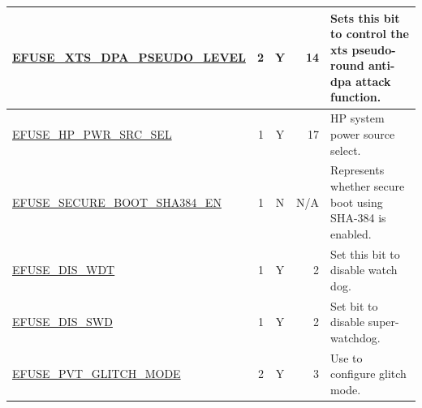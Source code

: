 \begin{longtable}[l]{ |m{8.2cm}|r|c|r|m{9cm}| }
    \hyperref[fielddesc:EFUSEXTSDPAPSEUDOLEVEL]{EFUSE\_XTS\_DPA\_PSEUDO\_LEVEL} & 2 & Y & 14 & Sets this bit to control the xts pseudo-round anti-dpa attack function. \\ \hline
    \hyperref[fielddesc:EFUSEHPPWRSRCSEL]{EFUSE\_HP\_PWR\_SRC\_SEL} & 1 & Y & 17 & HP system power source select. \\ \hline
    \hyperref[fielddesc:EFUSESECUREBOOTSHA384EN]{EFUSE\_SECURE\_BOOT\_SHA384\_EN} & 1 & N & N/A & Represents whether secure boot using SHA-384 is enabled. \\ \hline
    \hyperref[fielddesc:EFUSEDISWDT]{EFUSE\_DIS\_WDT} & 1 & Y & 2 & Set this bit to disable watch dog. \\ \hline
    \hyperref[fielddesc:EFUSEDISSWD]{EFUSE\_DIS\_SWD} & 1 & Y & 2 & Set bit to disable super-watchdog. \\ \hline
    \hyperref[fielddesc:EFUSEPVTGLITCHMODE]{EFUSE\_PVT\_GLITCH\_MODE} & 2 & Y & 3 & Use to configure glitch mode. \\ \hline
    \hline
\end{longtable}
